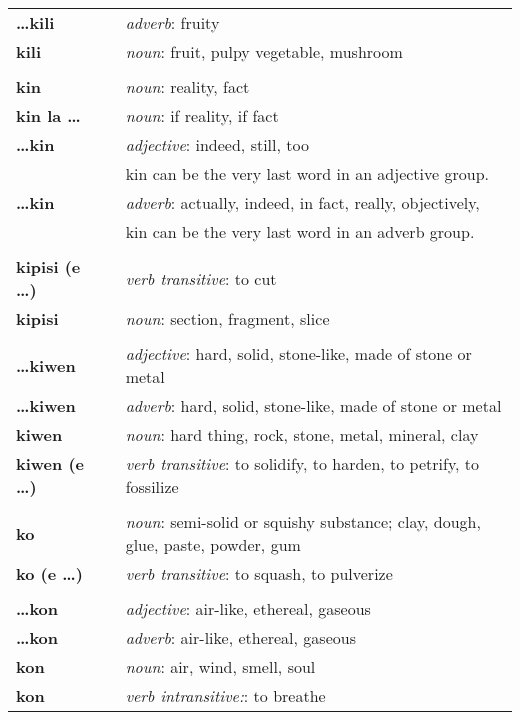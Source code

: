 \begin{supertabular}{p{2,5cm}|ll}
\textbf{\dots kili} && \textit{adverb}: fruity \\ 
\textbf{kili} && \textit{noun}: fruit, pulpy vegetable, mushroom \\ 
 && \\ %
\textbf{kin} && \textit{noun}: reality, fact \\  
\textbf{kin la \dots} && \textit{noun}: if reality, if fact \\  
\textbf{\dots kin} && \textit{adjective}: indeed, still, too \\ && kin can be the very last word in an adjective group. \\ 
\textbf{\dots kin} && \textit{adverb}: actually, indeed, in fact, really, objectively, \\ && kin can be the very last word in an adverb group. \\
 && \\ %
\textbf{kipisi (e \dots)} && \textit{verb transitive}: to cut \\ 
\textbf{kipisi } && \textit{noun}: section, fragment, slice \\ 
 && \\ %
\textbf{\dots kiwen} && \textit{adjective}: hard, solid, stone-like, made of stone or metal \\ 
\textbf{\dots kiwen} && \textit{adverb}: hard, solid, stone-like, made of stone or metal \\ 
\textbf{kiwen} && \textit{noun}: hard thing, rock, stone, metal, mineral, clay \\ 
\textbf{kiwen (e \dots)} && \textit{verb transitive}: to solidify, to harden, to petrify, to fossilize \\ 
 && \\ %
\textbf{ko} && \textit{noun}: semi-solid or squishy substance; clay, dough, glue, paste, powder, gum \\ 
\textbf{ko (e \dots)} && \textit{verb transitive}: to squash, to pulverize \\ 
 && \\ %
\textbf{\dots kon} && \textit{adjective}: air-like, ethereal, gaseous \\ 
\textbf{\dots kon} && \textit{adverb}: air-like, ethereal, gaseous \\ 
\textbf{kon} && \textit{noun}: air, wind, smell, soul \\ 
\textbf{kon} && \textit{verb intransitive:}: to breathe \\ 

\end{supertabular}
